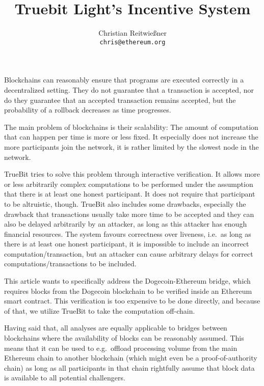 \documentclass[11pt,letterpaper]{article}
\date{}
\begin{document}


\title{Truebit Light's Incentive System}

\author{Christian Reitwießner \\ 
{\tt chris@ethereum.org}}


\maketitle



Blockchains can reasonably ensure that programs are executed correctly in a decentralized setting.
They do not guarantee that a transaction is accepted, nor do they guarantee that an accepted transaction remains
accepted, but the probability of a rollback decreases as time progresses.

The main problem of blockchains is their scalability: The amount of computation that can happen per time is more or less fixed.
It especially does not increase the more participants join the network, it is rather limited by the slowest node in the
network.

TrueBit tries to solve this problem through interactive verification. It allows more or less arbitrarily complex computations to
be performed under the assumption that there is at least one honest participant. It does not require that participant
to be altruistic, though. TrueBit also includes some drawbacks, especially the drawback that transactions usually take
more time to be accepted and they can also be delayed arbitrarily by an attacker, as long as this attacker has enough
financial resources. The system favours correctness over liveness, i.e.\ as long as there is at least one honest
participant, it is impossible to include an incorrect computation/transaction, but an attacker can cause arbitrary delays for
correct computations/transactions to be included.

This article wants to specifically address the Dogecoin-Ethereum bridge, which requires blocks from the Dogecoin
blockchain to be verified inside an Ethereum smart contract. This verification is too expensive to be done directly,
and because of that, we utilize TrueBit to take the computation off-chain.

Having said that, all analyses are equally applicable to bridges between blockchains where the availability of blocks
can be reasonably assumed. This means that it can be used to e.g.\ offload processing volume from the main Ethereum
chain to another blockchain (which might even be a proof-of-authority chain) as long as all participants in that chain
rightfully assume that block data is available to all potential challengers.
\end{document}
